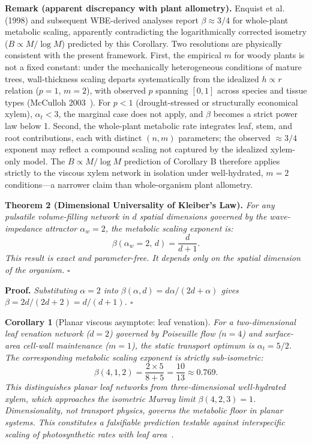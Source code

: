 \documentclass[11pt,a4paper]{article}
\newtheorem{corollary}[theorem]{Corollary}
\theoremstyle{remark}
\newcounter{manualthm}
\begin{document}
\noindent\textbf{Remark (apparent discrepancy with plant allometry).} Enquist et al.~\cite{enquist1998} (1998) and subsequent WBE-derived analyses report $\beta \approx 3/4$ for whole-plant metabolic scaling, apparently contradicting the logarithmically corrected isometry ($B \propto M/\log M$) predicted by this Corollary. Two resolutions are physically consistent with the present framework. First, the empirical $m$ for woody plants is not a fixed constant: under the mechanically heterogeneous conditions of mature trees, wall-thickness scaling departs systematically from the idealized $h \propto r$ relation ($p=1$, $m=2$), with observed $p$ spanning $[0, 1]$ across species and tissue types (McCulloh 2003~\cite{mcculloh2003}). For $p < 1$ (drought-stressed or structurally economical xylem), $\alpha_t < 3$, the marginal case does not apply, and $\beta$ becomes a strict power law below 1. Second, the whole-plant metabolic rate integrates leaf, stem, and root contributions, each with distinct $(n, m)$ parameters; the observed $\approx 3/4$ exponent may reflect a compound scaling not captured by the idealized xylem-only model. The $B \propto M/\log M$ prediction of Corollary B therefore applies strictly to the viscous xylem network in isolation under well-hydrated, $m = 2$ conditions---a narrower claim than whole-organism plant allometry.

\vspace{0.5em}
\noindent \textbf{Theorem 2 (Dimensional Universality of Kleiber's Law).}\label{thm:dimensional} \textit{For any pulsatile volume-filling network in $d$ spatial dimensions governed by the wave-impedance attractor $\alpha_w = 2$, the metabolic scaling exponent is:}
\begin{equation}
\beta(\alpha_w = 2,\, d) = \frac{d}{d+1}.
\end{equation}
\textit{This result is exact and parameter-free. It depends only on the spatial dimension of the organism.} $\square$

\noindent\textbf{Proof.} \textit{Substituting $\alpha = 2$ into $\beta(\alpha, d) = d\alpha/(2d+\alpha)$ gives $\beta = 2d/(2d+2) = d/(d+1)$. $\square$}

\begin{corollary}[Planar viscous asymptote: leaf venation]
For a two-dimensional leaf venation network ($d=2$) governed by
Poiseuille flow ($n=4$) and surface-area cell-wall maintenance
($m=1$), the static transport optimum is $\alpha_t = 5/2$. The
corresponding metabolic scaling exponent is strictly sub-isometric:
\[
  \beta(4,1,2) = \frac{2 \times 5}{8+5} = \frac{10}{13} \approx 0.769.
\]
This distinguishes planar leaf networks from three-dimensional
well-hydrated xylem, which approaches the isometric Murray limit
$\beta(4,2,3) = 1$. Dimensionality, not transport physics, governs
the metabolic floor in planar systems. This constitutes a falsifiable
prediction testable against interspecific scaling of photosynthetic
rates with leaf area~\cite{mcculloh2003, brodribb2007}.
\end{corollary}
\end{document}
